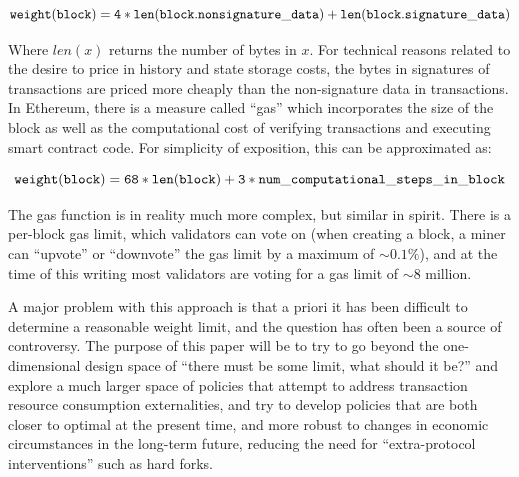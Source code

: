 \documentclass[12pt, final]{article}
\begin{document}
\begin{scriptsize}
\begin{equation}
\tt{weight(block) = 4 * len(block.nonsignature\_data) + len(block.signature\_data)}
\end{equation}
\end{scriptsize}

Where $len(x)$ returns the number of bytes in $x$. For technical reasons related to the desire to price in history and state storage costs, the bytes in signatures of transactions are priced more cheaply than the non-signature data in transactions. In Ethereum, there is a measure called ``gas'' which incorporates the size of the block as well as the computational cost of verifying transactions and executing smart contract code. For simplicity of exposition, this can be approximated as:

\begin{footnotesize}
\begin{equation}
\tt{weight(block) = 68 * len(block) + 3 * num\_computational\_steps\_in\_block}
\end{equation}
\end{footnotesize}

The gas function is in reality much more complex, but similar in spirit. There is a per-block gas limit, which validators can vote on (when creating a block, a miner can ``upvote'' or ``downvote'' the gas limit by a maximum of $\sim\!0.1\%$), and at the time of this writing most validators are voting for a gas limit of $\sim \! 8$ million.

A major problem with this approach is that a priori it has been difficult to determine a reasonable weight limit, and the question has often been a source of controversy\cite{blocksizedebate}. The purpose of this paper will be to try to go beyond the one-dimensional design space of ``there must be some limit, what should it be?'' and explore a much larger space of policies that attempt to address transaction resource consumption externalities, and try to develop policies that are both closer to optimal at the present time, and more robust to changes in economic circumstances in the long-term future, reducing the need for ``extra-protocol interventions'' such as hard forks.
\end{document}
